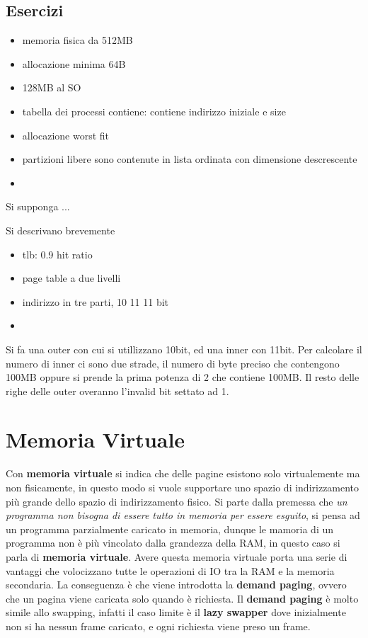 \documentclass[12pt]{article}
\begin{document}
\subsection{Esercizi}
\begin{example}{}{}
  \begin{itemize}
    \item memoria fisica da 512MB
    \item allocazione minima 64B
    \item 128MB al SO
    \item tabella dei processi contiene: contiene indirizzo iniziale e size
    \item allocazione worst fit
    \item partizioni libere sono contenute in lista ordinata con dimensione descrescente
    \item 
  \end{itemize}
  Si supponga ...
\end{example}
\begin{example}{}{}
  Si descrivano brevemente 
  \begin{itemize}
    \item tlb: 0.9 hit ratio
    \item page table a due livelli
    \item indirizzo in tre parti, 10 11 11 bit
    \item 
  \end{itemize}
  Si fa una outer con cui si utillizzano 10bit, ed una inner con 11bit. Per calcolare il numero di inner ci sono due strade, il numero di byte preciso che contengono 100MB oppure si prende la prima potenza di 2 che contiene 100MB. Il resto delle righe delle outer overanno l'invalid bit settato ad 1.
\end{example}



\newpage
\section{Memoria Virtuale}
Con \textbf{memoria virtuale} si indica che delle pagine esistono solo virtualemente ma non fisicamente, in questo modo si vuole supportare uno spazio di indirizzamento pi\`u grande dello spazio di indirizzamento fisico. Si parte dalla premessa che \emph{un programma non bisogna di essere tutto in memoria per essere esguito}, si pensa ad un programma parzialmente caricato in memoria, dunque le mamoria di un programma non \`e pi\`u vincolato dalla grandezza della RAM, in questo caso si parla di \textbf{memoria virtuale}. Avere questa memoria virtuale porta una serie di vantaggi che volocizzano tutte le operazioni di IO tra la RAM e la memoria secondaria. La conseguenza \`e che viene introdotta la \textbf{demand paging}, ovvero che un pagina viene caricata solo quando \`e richiesta. Il \textbf{demand paging} \`e molto simile allo swapping, infatti il caso limite \`e il \textbf{lazy swapper} dove inizialmente non si ha nessun frame caricato, e ogni richiesta viene preso un frame.
\end{document}
